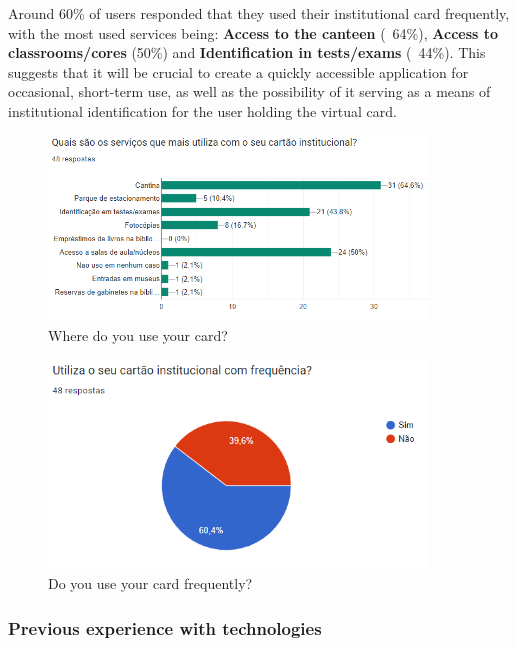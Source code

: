 \documentclass[10pt]{article}
\begin{document}
Around 60\% of users responded that they used their institutional card frequently, with the most used services being: \textbf{Access to the canteen} (~64\%), \textbf{Access to classrooms/cores} (50\%) and \textbf{Identification in tests/exams} (~44\%).
This suggests that it will be crucial to create a quickly accessible application for occasional, short-term use, as well as the possibility of it serving as a means of institutional identification for the user holding the virtual card.

\begin{figure}[h]
    \centering
    \includegraphics[width=0.9\textwidth]{report-images/questionaire2.png}
    \caption{Where do you use your card?}
\end{figure}

\begin{figure}[h]
    \centering
    \includegraphics[width=0.9\textwidth]{report-images/questionaire3.png}
    \caption{Do you use your card frequently?}
\end{figure}

\subsubsection{Previous experience with technologies}
\end{document}
